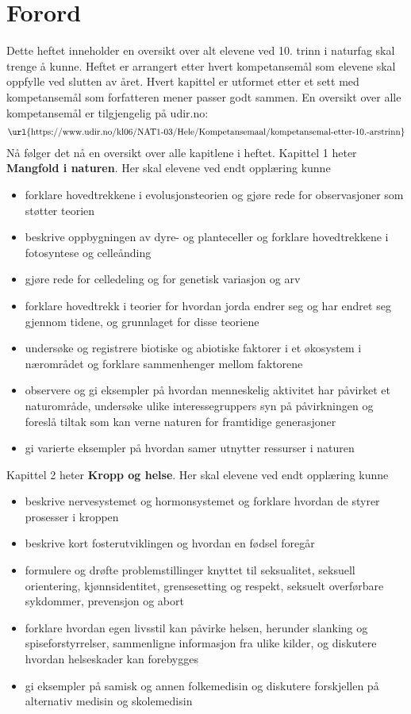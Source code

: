 \documentclass[main.tex]{subfiles}
\begin{document}
\section*{Forord}
Dette heftet inneholder en oversikt over alt elevene ved 10. trinn i naturfag skal trenge å kunne. Heftet er arrangert etter hvert kompetansemål som elevene skal oppfylle ved slutten av året. Hvert kapittel er utformet etter et sett med kompetansemål som forfatteren mener passer godt sammen. En oversikt over alle kompetansemål er tilgjengelig på udir.no:
\begin{align*}
\text{\url{https://www.udir.no/kl06/NAT1-03/Hele/Kompetansemaal/kompetansemal-etter-10.-arstrinn}}
\end{align*}
Nå følger det nå en oversikt over alle kapitlene i heftet. Kapittel 1 heter \textbf{Mangfold i naturen}. Her skal elevene ved endt opplæring kunne
\begin{itemize}[noitemsep]
\item forklare hovedtrekkene i evolusjonsteorien og gjøre rede for observasjoner som støtter teorien
\item beskrive oppbygningen av dyre- og planteceller og forklare hovedtrekkene i fotosyntese og celleånding
\item gjøre rede for celledeling og for genetisk variasjon og arv
\item forklare hovedtrekk i teorier for hvordan jorda endrer seg og har endret seg gjennom tidene, og grunnlaget for disse teoriene
\item undersøke og registrere biotiske og abiotiske faktorer i et økosystem i nærområdet og forklare sammenhenger mellom faktorene
\item observere og gi eksempler på hvordan menneskelig aktivitet har påvirket et naturområde, undersøke ulike interessegruppers syn på påvirkningen og foreslå tiltak som kan verne naturen for framtidige generasjoner
\item gi varierte eksempler på hvordan samer utnytter ressurser i naturen
\end{itemize} 
Kapittel 2 heter \textbf{Kropp og helse}. Her skal elevene ved endt opplæring kunne
\begin{itemize}[noitemsep]
\item beskrive nervesystemet og hormonsystemet og forklare hvordan de styrer prosesser i kroppen
\item beskrive kort fosterutviklingen og hvordan en fødsel foregår
\item formulere og drøfte problemstillinger knyttet til seksualitet, seksuell orientering, kjønnsidentitet, grensesetting og respekt, seksuelt overførbare sykdommer, prevensjon og abort
\item forklare hvordan egen livsstil kan påvirke helsen, herunder slanking og spiseforstyrrelser, sammenligne informasjon fra ulike kilder, og diskutere hvordan helseskader kan forebygges
\item gi eksempler på samisk og annen folkemedisin og diskutere forskjellen på alternativ medisin og skolemedisin
\end{itemize} 
\end{document}
